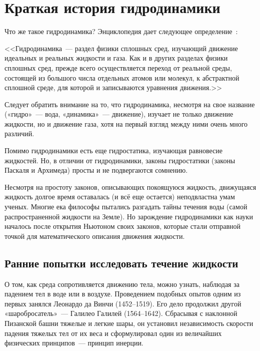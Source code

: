 
\section*{Краткая история гидродинамики \cite{history}}

Что же такое гидродинамика? Энциклопедия дает следующее определение~\cite{wiki}:

<<Гидродинамика~--- раздел физики сплошных сред, изучающий движение идеальных и реальных жидкости и газа.
Как и в других разделах физики сплошных сред, прежде всего осуществляется переход от реальной среды, 
состоящей из большого числа отдельных атомов или молекул, к абстрактной сплошной среде, для которой и 
записываются уравнения движения.>>

Следует обратить внимание на то, что гидродинамика, несмотря на свое название («гидро»~--- вода, 
«динамика»~--- движение), изучает не только движение жидкости, но и движение газа, хотя на первый 
взгляд между ними очень много различий.

Помимо гидродинамики есть еще гидростатика, изучающая равновесие жидкостей. Но, в отличии от 
гидродинамики, законы гидростатики (законы Паскаля и Архимеда) просты и не подвергаются сомнению.

Несмотря на простоту законов, описывающих покоящуюся жидкость, движущаяся жидкость долгое время 
оставалась (и всё еще остается) неподвластна умам ученых. Многие ека философы пытались разгадать 
тайны течения воды (самой распространенной жидкости на Земле). Но зарождение гидродинамики как науки 
началось после открытия Ньютоном своих законов, которые стали отправной точкой для математического 
описания движения жидкости.

\subsection*{Ранние попытки исследовать течение жидкости}

О том, как среда сопротивляется движению тела, можно узнать, наблюдая за падением тел в воде или в воздухе. 
Проведением подобных опытов одним из первых занялся Леонардо да Винчи (1452--1519). 
Его дело продолжил другой «шаробросатель»~--- Галилео Галилей (1564--1642). 
Сбрасывая с наклонной Пизанской башни тяжелые и легкие шары, он установил независимость 
скорости падения тяжелых тел от их веса и сформулировал один из величайших физических принципов~--- принцип инерции.

